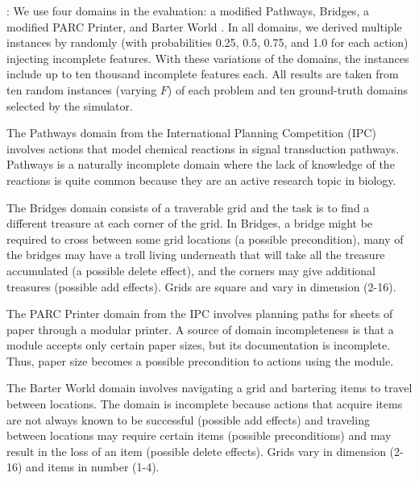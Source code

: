 \documentclass[letterpaper]{article}
\def\und#1{\noindent{\bf #1}:}
\def\citep#1{\cite{#1}}
\begin{document}
\und{Domains} We use four domains in the evaluation: a modified Pathways,
Bridges,  a modified PARC Printer, and Barter World \citep{bryce-icaps11}.  In
all domains, we derived multiple instances by randomly (with probabilities 0.25,
0.5, 0.75, and 1.0 for each action) injecting incomplete  features.   
With these variations of the domains, the instances include up to ten thousand
incomplete  features each. All results are taken from ten random instances
(varying $F$) of each problem and ten ground-truth domains selected by the
simulator.

The Pathways  domain from the International Planning Competition  (IPC) involves actions that model chemical reactions in signal
transduction pathways.  Pathways is a naturally incomplete domain where the lack
of knowledge of the reactions is quite common because they are an active
research topic in biology.  

The Bridges  domain consists of a traverable grid and the task is to find a
different treasure at each corner of the grid. In Bridges,
a bridge might be required  to cross between some grid locations (a possible
precondition), many of the bridges may have a troll living
underneath that will take all the treasure accumulated (a possible delete
effect), and the corners may give additional treasures (possible add
effects).  Grids are square and vary in dimension (2-16).

The PARC Printer  domain from the IPC involves planning paths for sheets of
paper through a modular printer.  A source of domain incompleteness is that a module
accepts only certain paper sizes, but its documentation is incomplete.  Thus,
paper size becomes a possible precondition to actions using the module.

The Barter World  domain involves navigating a grid and bartering items to
travel between locations.  The domain is incomplete because actions that acquire
 items are not always known to be successful (possible add effects) and traveling between locations may require
certain items (possible preconditions) and may result in the loss of an item
(possible delete effects). Grids vary in dimension (2-16) and items
in number (1-4).
\end{document}
